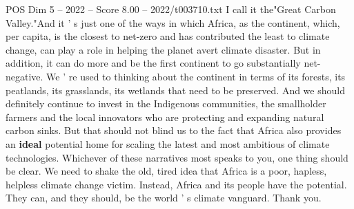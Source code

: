 \begin{textsample}{POS Dim 5 – 2022 – Score 8.00 – 2022/t003710.txt}
I call it the"Great Carbon Valley."And it ' s just one of the ways in which Africa, as the continent, which, per capita, is the closest to net-zero and has contributed the least to climate change, can play a role in helping the planet avert climate disaster.
But in addition, it can do more and be the first continent to go substantially net-negative.
We ' re used to thinking about the continent in terms of its forests, its peatlands, its grasslands, its wetlands that need to be preserved.
And we should definitely continue to invest in the Indigenous communities, the smallholder farmers and the local innovators who are protecting and expanding natural carbon sinks.
But that should not blind us to the fact that Africa also provides an \textbf{ideal} potential home for scaling the latest and most ambitious of climate technologies.
Whichever of these narratives most speaks to you, one thing should be clear.
We need to shake the old, tired idea that Africa is a poor, hapless, helpless climate change victim.
Instead, Africa and its people have the potential.
They can, and they should, be the world ' s climate vanguard.
Thank you.

\end{textsample}
